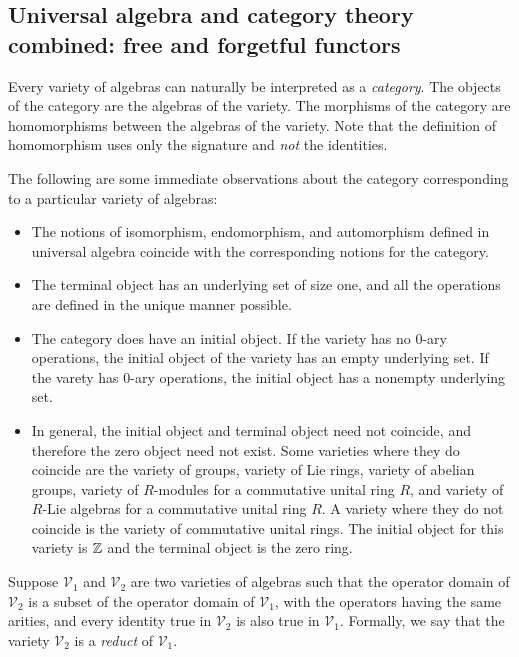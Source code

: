 \subsection{Universal algebra and category theory combined: free and forgetful functors}\label{appsec:free-forgetful}

Every variety of algebras can naturally be interpreted as a {\em
  category}. The objects of the category are the algebras of the
variety. The morphisms of the category are homomorphisms between the
algebras of the variety. Note that the definition of homomorphism uses
only the signature and {\em not} the identities.

The following are some immediate observations about the category
corresponding to a particular variety of algebras:

\begin{itemize}
\item The notions of isomorphism, endomorphism, and automorphism
  defined in universal algebra coincide with the corresponding notions
  for the category.
\item The terminal object has an underlying set of size one, and all
  the operations are defined in the unique manner possible.
\item The category does have an initial object. If the variety has no
  0-ary operations, the initial object of the variety has an empty
  underlying set. If the varety has 0-ary operations, the initial
  object has a nonempty underlying set.
\item In general, the initial object and terminal object need not
  coincide, and therefore the zero object need not exist. Some
  varieties where they do coincide are the variety of groups, variety
  of Lie rings, variety of abelian groups, variety of $R$-modules for
  a commutative unital ring $R$, and variety of $R$-Lie algebras for a
  commutative unital ring $R$. A variety where they do not coincide is
  the variety of commutative unital rings. The initial object for this
  variety is $\mathbb{Z}$ and the terminal object is the zero ring.
\end{itemize}

Suppose $\mathcal{V}_1$ and $\mathcal{V}_2$ are two varieties of
algebras such that the operator domain of $\mathcal{V}_2$ is a subset
of the operator domain of $\mathcal{V}_1$, with the operators having
the same arities, and every identity true in $\mathcal{V}_2$ is also
true in $\mathcal{V}_1$. Formally, we say that the variety
$\mathcal{V}_2$ is a {\em reduct} of $\mathcal{V}_1$.

